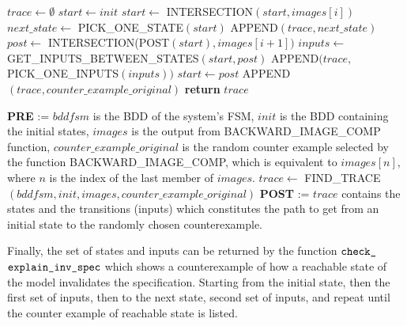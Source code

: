 \newpage

\begin{algorithmic}[1]
    \State $trace \leftarrow \emptyset$
    \State $start \leftarrow init$
     
        \State $start \leftarrow$ INTERSECTION$(start, images[i])$
        \State $next\_state \leftarrow$ PICK\_ONE\_STATE$(start)$
        \State APPEND$(trace, next\_state)$
        \State $post \leftarrow$ INTERSECTION(POST$(start), images[i+1])$
        \State $inputs \leftarrow$ GET\_INPUTS\_BETWEEN\_STATES$(start, post)$
        \State APPEND$(trace,$ PICK\_ONE\_INPUTS$(inputs))$
        \State $start \leftarrow post$
    \EndFor
    \State APPEND$(trace, counter\_example\_original)$
    \State \textbf{return }$trace$
\EndFunction
\item[]
\State \textbf{PRE} := $bddfsm$ is the BDD of the system's FSM, $init$ is the BDD containing the initial states, $images$ is the output from BACKWARD\_IMAGE\_COMP function, $counter\_example\_original$ is the random counter example selected by the function BACKWARD\_IMAGE\_COMP, which is equivalent to $images[n]$, where $n$ is the index of the last member of $images$.
\State $trace\leftarrow$ FIND\_TRACE$(bddfsm, init, images, counter\_example\_original)$
\State \textbf{POST} := $trace$ contains the states and the transitions (inputs) which constitutes the path to get from an initial state to the randomly chosen counterexample.
\end{algorithmic}

\medskip
Finally, the set of states and inputs can be returned by the function $\verb|check_|$\\$\verb|explain_inv_spec|$ which shows a counterexample of how a reachable state of the model invalidates the specification. Starting from the initial state, then the first set of inputs, then to the next state, second set of inputs, and repeat until the counter example of reachable state is listed.

\medskip

